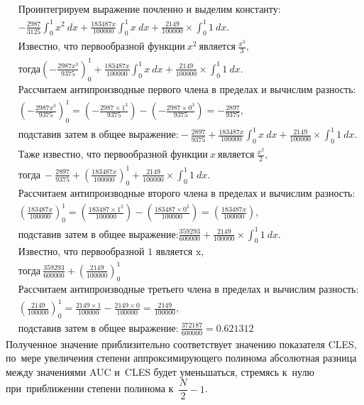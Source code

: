 \documentclass[]{scrreprt}
\begin{document}
\begin{equation*}\label{eq:AUC-integral-2}
\begin{aligned}
&\text{Проинтегрируем выражение почленно и~выделим константу:}\\
&-\frac{2987}{3125} \int_{0}^{1} x^{2}~dx + \frac{183487x}{100000} \int_{0}^{1}x~dx + \frac{2149}{100000} \times \int_{0}^{1} 1~dx.\\
&\text{Известно, что~первообразной функции}\ x^2\ \text{является}\ \frac{x^3}{3}, \\
&\text{тогда} \left(-\frac{2987x^{3}}{9375}\right)_{0}^{1} + \frac{183487x}{100000} \int_{0}^{1}x~dx + \frac{2149}{100000} \times \int_{0}^{1} 1~dx.\\
&\text{Рассчитаем антипроизводные первого члена в~пределах и~вычислим разность:}\\ &\left(-\frac{2987x^{3}}{9375}\right)_{0}^{1} = \left(-\frac{2987 \times 1^{3}}{9375}\right) - \left(-\frac{2987 \times 0^{3}}{9375}\right) = -\frac{2897}{9375},\\
&\text{подставив затем в~общее выражение:} -\frac{2897}{9375} + \frac{183487x}{100000} \int_{0}^{1}x~dx + \frac{2149}{100000} \times \int_{0}^{1} 1~dx.\\
& \text{Таже известно, что~первообразной функции}\ x\ \text{является}\ \frac{x^2}{2}, \\
&\text{тогда}\ -\frac{2897}{9375} + \left(\frac{183487x}{100000}\right)_{0}^{1} + \frac{2149}{100000} \times \int_{0}^{1} 1~dx.\\
&\text{Рассчитаем антипроизводные второго члена в~пределах и~вычислим разность:}\\
&\left(\frac{183487x}{100000}\right)_{0}^{1} = \left(\frac{183487 \times 1^2}{100000}\right) - \left(\frac{183487 \times 0^2}{100000}\right) = \left(\frac{183487x}{100000}\right),\\
&\text{подставив затем в~общее выражение:} \frac{359293}{600000} + \frac{2149}{100000} \times \int_{0}^{1} 1~dx.\\
&\text{Известно, что~первообразной 1 является x,}\\
&\text{тогда}\ \frac{359293}{600000} + \left(\frac{2149}{100000}\right)_{0}^{1}\\
&\text{Рассчитаем антипроизводные третьего члена в~пределах и~вычислим разность:}\\
&\left(\frac{2149}{100000}\right)_{0}^{1} = \frac{2149 \times 1}{100000} - \frac{2149 \times 0}{100000} = \frac{2149}{100000},\\
&\text{подставив затем в~общее выражение:}\ \frac{372187}{600000}=0.621312
\end{aligned}
\end{equation*}
Полученное значение приблизительно соответствует значению показателя CLES, по~мере увеличения степени аппроксимирующего полинома абсолютная разница между значениями AUC и~CLES будет уменьшаться, стремясь к~нулю при~приближении степени полинома к~$\dfrac{N}{2}-1$.
\end{document}
